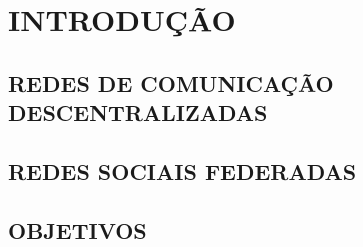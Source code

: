 \chapter{INTRODUÇÃO}






\section{REDES DE COMUNICAÇÃO DESCENTRALIZADAS}





\section{REDES SOCIAIS FEDERADAS}









\section{OBJETIVOS}
